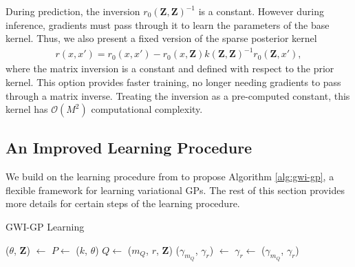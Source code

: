 \documentclass{article}
\numberwithin{equation}{section}
\begin{document}
During prediction, the inversion $r_0\left(\mathbf{Z}, \mathbf{Z}\right)^{-1}$ is a constant. However during inference, gradients must pass through it to learn the parameters of the base kernel. Thus, we also present a fixed version of the sparse posterior kernel
\begin{align}
    r(x, x') = r_0(x, x') - r_0\left(x, \mathbf{Z}\right) k\left(\mathbf{Z}, \mathbf{Z}\right)^{-1} r_0\left(\mathbf{Z}, x'\right),
\end{align}
where the matrix inversion is a constant and defined with respect to the prior kernel. This option provides faster training, no longer needing gradients to pass through a matrix inverse. Treating the inversion as a pre-computed constant, this kernel has $\mathcal{O}(M^2)$ computational complexity.

\subsection{An Improved Learning Procedure}
We build on the learning procedure from \cite{wild2022generalized} to propose Algorithm \ref{alg:gwi-gp}, a flexible framework for learning variational GPs. 
The rest of this section provides more details for certain steps of the learning procedure.
\begin{algorithm}[h!]
\caption{GWI-GP Learning}\label{alg:gwi-gp}
\begin{algorithmic}
     
    \State ($\theta$, $\mathbf{Z}$) $\leftarrow$  
    \State $P \leftarrow$ ($k$, $\theta$) 
    \State $Q \leftarrow$ ($m_Q$, $r$, $\mathbf{Z}$) 
    \State ($\gamma_{m_Q}$, $\gamma_r$) $\leftarrow$  
    \State $\gamma_r \leftarrow$  
    \State \Return ($\gamma_{m_Q}$, $\gamma_r$)
\end{algorithmic}
\end{algorithm}
\end{document}
